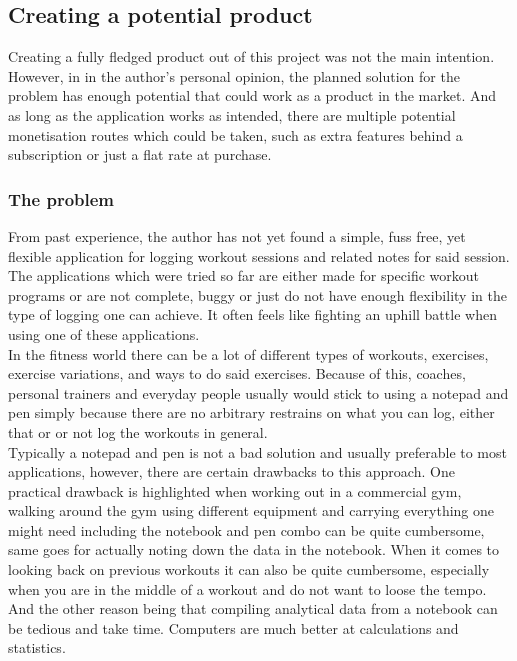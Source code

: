 \documentclass{article}
\newcommand{\vspaceconst}{-2ex}
\begin{document}
\begin{multicols}{2}
\subsection{Creating a potential product}
\vspace{\vspaceconst}

Creating a fully fledged product out of this project was not the main intention. However, in in the author's personal opinion, the planned solution for the problem has enough potential that could work as a product in the market. And as long as the application works as intended, there are multiple potential monetisation routes which could be taken, such as extra features behind a subscription or just a flat rate at purchase.\\

\subsubsection{The problem}
\vspace{\vspaceconst}

From past experience, the author has not yet found a simple, fuss free, yet flexible application for logging workout sessions and related notes for said session. The applications which were tried so far are either made for specific workout programs or are not complete, buggy or just do not have enough flexibility in the type of logging one can achieve. It often feels like fighting an uphill battle when using one of these applications.\\
In the fitness world there can be a lot of different types of workouts, exercises, exercise variations, and ways to do said exercises. Because of this, coaches, personal trainers and everyday people usually would stick to using a notepad and pen simply because there are no arbitrary restrains on what you can log, either that or or not log the workouts in general.\\
Typically a notepad and pen is not a bad solution and usually preferable to most applications, however, there are certain drawbacks to this approach. One practical drawback is highlighted when working out in a commercial gym, walking around the gym using different equipment and carrying everything one might need including the notebook and pen combo can be quite cumbersome, same goes for actually noting down the data in the notebook. When it comes to looking back on previous workouts it can also be quite cumbersome, especially when you are in the middle of a workout and do not want to loose the tempo. And the other reason being that compiling analytical data from a notebook can be tedious and take time. Computers are much better at calculations and statistics.\\


\end{multicols}
\end{document}
